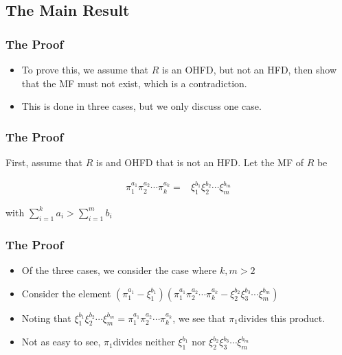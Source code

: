 \subsection{The Main Result}

\begin{frame}
  \frametitle{The Proof}
  \begin{itemize}
    \item To prove this, we assume that $R$ is an OHFD, but not an HFD, then show that the MF must not exist, which is a contradiction.
    \item This is done in three cases, but we only discuss one case.
  \end{itemize}
\end{frame}

\begin{frame}
  \frametitle{The Proof}

  First, assume that $R$ is and OHFD that is not an HFD. Let the MF
  of $R$ be 

  \begin{align*}
    \pi_{1}^{a_{1}}\pi_{2}^{a_{2}}\cdots\pi_{k}^{a_{k}}= & \xi_{1}^{b_{1}}\xi_{2}^{b_{2}}\cdots\xi_{m}^{b_{m}}
  \end{align*}

  with $\sum_{i=1}^{k}a_{i}>\sum_{i=1}^{m}b_{i}$
\end{frame}

\begin{frame}
  \frametitle{The Proof}
  \begin{itemize}
    \item Of the three cases, we consider the case where $k,m>2$
  \end{itemize}

  \pause{}
  \begin{itemize}
    \item Consider the element $(\pi_{1}^{a_{1}}-\xi_{1}^{b_{1}})(\pi_{1}^{a_{1}}\pi_{2}^{a_{2}}\cdots\pi_{k}^{a_{k}}-\xi_{2}^{b_{2}}\xi_{3}^{b_{3}}\cdots\xi_{m}^{b_{m}})$
  \end{itemize}

  \pause{}
  \begin{itemize}
    \item Noting that $\xi_{1}^{b_{1}}\xi_{2}^{b_{2}}\cdots\xi_{m}^{b_{m}}=\pi_{1}^{a_{1}}\pi_{2}^{a_{2}}\cdots\pi_{k}^{a_{k}}$,
      we see that $\pi_{1}$divides this product. 
  \end{itemize}

  \pause{}
  \begin{itemize}
    \item Not as easy to see, $\pi_{1}$divides neither $\xi_{1}^{b_{1}}$ nor
      $\xi_{2}^{b_{2}}\xi_{3}^{b_{3}}\cdots\xi_{m}^{b_{m}}$
  \end{itemize}
\end{frame}

